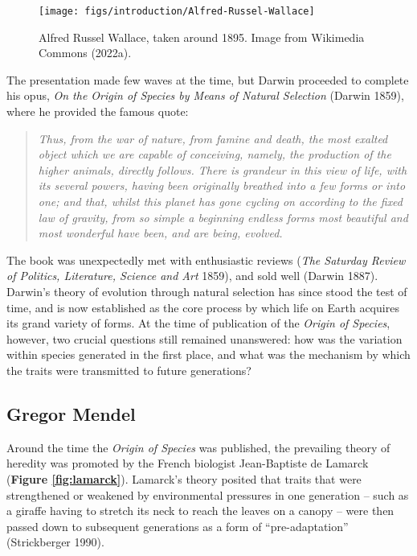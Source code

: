 \documentclass[
]{book}
\begin{document}
\begin{figure}

{\centering \texttt{[image: figs/introduction/Alfred-Russel-Wallace]} 

}

\caption{Alfred Russel Wallace, taken around 1895. Image from Wikimedia Commons (2022a).}\label{fig:alfred-wallace}
\end{figure}

The presentation made few waves at the time, but Darwin proceeded to complete his opus, \emph{On the Origin of Species by Means of Natural Selection} (Darwin 1859), where he provided the famous quote:

\begin{quote}
\emph{Thus, from the war of nature, from famine and death, the most exalted object which we are capable of conceiving, namely, the production of the higher animals, directly follows. There is grandeur in this view of life, with its several powers, having been originally breathed into a few forms or into one; and that, whilst this planet has gone cycling on according to the fixed law of gravity, from so simple a beginning endless forms most beautiful and most wonderful have been, and are being, evolved.}
\end{quote}

The book was unexpectedly met with enthusiastic reviews (\emph{The {Saturday Review} of {Politics}, {Literature}, {Science} and {Art}} 1859), and sold well (Darwin 1887). Darwin's theory of evolution through natural selection has since stood the test of time, and is now established as the core process by which life on Earth acquires its grand variety of forms. At the time of publication of the \emph{Origin of Species}, however, two crucial questions still remained unanswered: how was the variation within species generated in the first place, and what was the mechanism by which the traits were transmitted to future generations?

\hypertarget{gregor-mendel}{%
\subsection{Gregor Mendel}\label{gregor-mendel}}

Around the time the \emph{Origin of Species} was published, the prevailing theory of heredity was promoted by the French biologist Jean-Baptiste de Lamarck (\textbf{Figure \ref{fig:lamarck}}). Lamarck's theory posited that traits that were strengthened or weakened by environmental pressures in one generation -- such as a giraffe having to stretch its neck to reach the leaves on a canopy -- were then passed down to subsequent generations as a form of ``pre-adaptation'' (Strickberger 1990).
\end{document}
